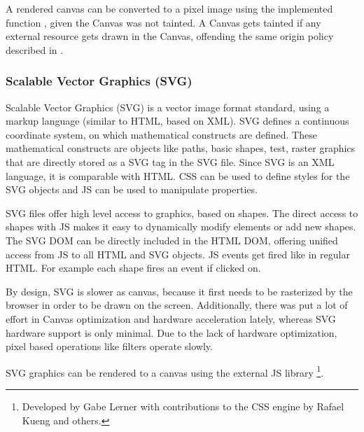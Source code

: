 A rendered canvas can be converted to a pixel image using the implemented function , given the Canvas was not tainted.
A Canvas gets tainted if any external resource gets drawn in the Canvas, offending the same origin policy described in .

\subsubsection{Scalable Vector Graphics (SVG)}
\label{sec:svg}

Scalable Vector Graphics (SVG) is a vector image format standard, using a markup language (similar to HTML, based on XML).
SVG defines a continuous coordinate system, on which mathematical constructs are defined.
These mathematical constructs are objects like paths, basic shapes, test, raster graphics that are directly stored as a SVG tag in the SVG file.
Since SVG is an XML language, it is comparable with HTML.
CSS can be used to define styles for the SVG objects and JS can be used to manipulate properties.

SVG files offer high level access to graphics, based on shapes.
The direct access to shapes with JS makes it easy to dynamically modify elements or add new shapes.
The SVG DOM can be directly included in the HTML DOM, offering unified access from JS to all HTML and SVG objects.
JS events get fired like in regular HTML.
For example each shape fires an  event if clicked on.


By design, SVG is slower as canvas, because it first needs to be rasterized by the browser in order to be drawn on the screen.
Additionally, there was put a lot of effort in Canvas optimization and hardware acceleration lately, whereas SVG hardware support is only minimal.
Due to the lack of hardware optimization, pixel based operations like filters operate slowly.

SVG graphics can be rendered to a canvas using the external JS library \footnote{Developed by Gabe Lerner with contributions to the CSS engine by Rafael Kueng and others.}.




